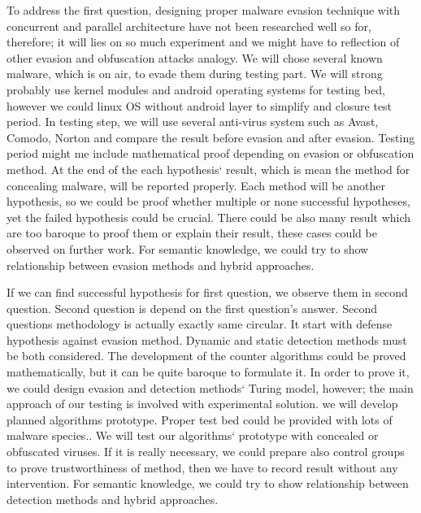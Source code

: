 

	To address the first question, designing proper malware evasion technique with concurrent and parallel architecture have not been researched well so for, therefore; it will lies on so much experiment and we might have to reflection of other evasion and obfuscation attacks analogy.  We will chose several known malware, which is on air, to  evade them during testing part. We will strong probably use kernel modules and android operating systems for testing bed, however we could linux OS without android layer to simplify and closure test period. In testing step, we will use several anti-virus system such as Avast, Comodo, Norton and compare the result before evasion and after evasion. Testing period might me include mathematical proof depending on evasion or obfuscation method. At the end of the each hypothesis` result, which is mean the method for concealing malware, will be reported properly. Each method will be another hypothesis, so we could be proof whether multiple or none successful hypotheses, yet the failed hypothesis could be crucial. There could be also many result which are too baroque to proof them or explain their result, these cases could be observed on further work. For semantic knowledge, we could try to show relationship between evasion methods and hybrid approaches.

	If we can find successful hypothesis for first question, we observe them in second question. Second question is depend on the first question's answer. Second questions methodology is actually exactly same circular. It start with defense hypothesis against evasion method. Dynamic and static detection methods must be both considered. The development of the counter algorithms could be proved mathematically, but it can be quite baroque to formulate it. In order to prove it, we could design evasion and detection methods` Turing model, however; the main approach of our testing is involved with experimental solution. we will develop planned algorithms prototype. Proper test bed could be provided with lots of malware species.. We will test our algorithms` prototype with concealed or obfuscated viruses. If it is really necessary, we could prepare also control groups to prove trustworthiness of method, then we have to record result without any intervention. For semantic knowledge, we could try to show relationship between detection methods and hybrid approaches.
	\newpage

